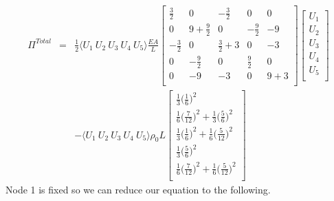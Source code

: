 \documentclass[a4paper]{article}
\begin{document}
\begin{eqnarray*}
\Pi^{Total} & = & \frac{1}{2}\langle U_{1} \ U_{2} \ U_{3} \ U_{4} \ U_{5} \rangle \frac{EA}{L} \begin{bmatrix}
\frac{3}{2} & 0 & -\frac{3}{2} & 0 & 0 \\
0 & 9 + \frac{9}{2} & 0 & -\frac{9}{2} & -9\\
-\frac{3}{2} & 0 & \frac{3}{2} + 3 & 0 & -3\\
0 & -\frac{9}{2} & 0 & \frac{9}{2} & 0\\
0 & -9 & -3 & 0 & 9 +3\\
\end{bmatrix}
\begin{bmatrix}
U_{1}\\
U_{2}\\
U_{3}\\
U_{4}\\
U_{5}\\
\end{bmatrix}\\
& & - \langle U_{1} \ U_{2} \ U_{3} \ U_{4} \ U_{5} \rangle
\rho_{0}L
\begin{bmatrix}
\frac{1}{3} \big( \frac{1}{6}\big)^{2}\\[3pt]
\frac{1}{6} \big(\frac{7}{12} \big)^{2}+\frac{1}{3} \big(\frac{5}{6}\big)^{2}\\[3pt]
\frac{1}{3} \big(\frac{1}{6} \big)^{2}+\frac{1}{6} \big(\frac{5}{12}\big)^{2}\\[3pt]
\frac{1}{3} \big( \frac{5}{6}\big)^{2}\\[3pt]
\frac{1}{6} \big(\frac{7}{12} \big)^{2}+\frac{1}{6} \big(\frac{5}{12}\big)^{2}\\
\end{bmatrix}
\end{eqnarray*}
Node 1 is fixed so we can reduce our equation to the following.
\end{document}
